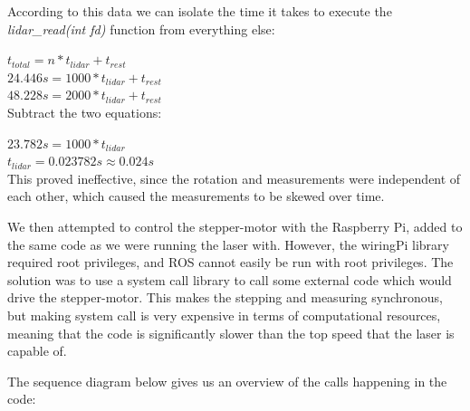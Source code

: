 According to this data we can isolate the time it takes to execute the \textit{lidar\_read(int fd)} function from everything else:

$t_{total} = n*t_{lidar} + t_{rest}$ \\

$24.446s = 1000*t_{lidar} + t_{rest}$ \\
$48.228s = 2000*t_{lidar} + t_{rest}$ \\

Subtract the two equations:

$23.782s = 1000*t_{lidar}$ \\
$t_{lidar} = 0.023782s \approx 0.024s$ \\


This proved ineffective, since the rotation and measurements were independent of each other, which caused the measurements to be skewed over time.

We then attempted to control the stepper-motor with the Raspberry Pi, added to the same code as we were running the laser with. However, the wiringPi library required root privileges, and ROS cannot easily be run with root privileges. The solution was to use a system call library to call some external code which would drive the stepper-motor. This makes the stepping and measuring synchronous, but making system call is very expensive in terms of computational resources, meaning that the code is significantly slower than the top speed that the laser is capable of.



\clearpage
The sequence diagram below gives us an overview of the calls happening in the code:

